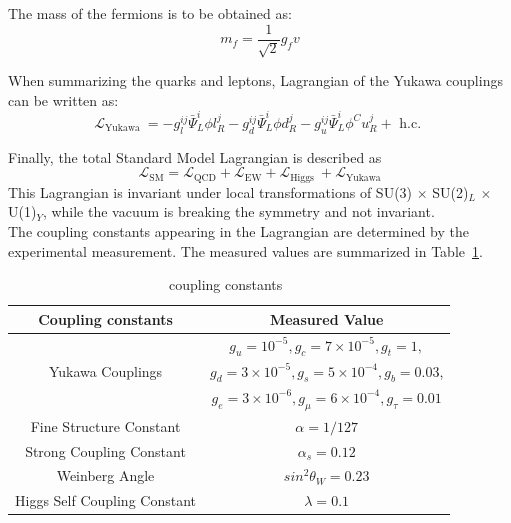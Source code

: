 The mass of the fermions is to be obtained as:
\begin{equation}
m_{f}=\frac{1}{\sqrt{2}} g_{f} v
\end{equation}

When summarizing the quarks and leptons, Lagrangian of the Yukawa couplings can be written as:
\begin{equation}
\mathcal{L}_{\text {Yukawa }}=-g_{l}^{i j} \bar{\Psi}_{L}^{i} \phi l_{R}^{j}-g_{d}^{i j} \bar{\Psi}_{L}^{i} \phi d_{R}^{j}-g_{u}^{i j} \bar{\Psi}_{L}^{i} \phi^{C} u_{R}^{j}+\text { h.c. }
\end{equation}

Finally, the total Standard Model Lagrangian is described as 
\begin{equation}
\mathcal{L}_{\mathrm{SM}}=\mathcal{L}_{\mathrm{QCD}}+\mathcal{L}_{\mathrm{EW}}+\mathcal{L}_{\text {Higgs }}+\mathcal{L}_{\text {Yukawa}}
\end{equation}
This Lagrangian is invariant under local transformations of SU(3) $\times$ SU(2)$_L$ $\times$ U(1)$_Y$, while the vacuum is breaking the symmetry and not invariant. \\

The coupling constants appearing in the Lagrangian are determined by the experimental measurement. 
The measured values are summarized in Table~\ref{tab:constants}.  \\

\begin{center}
\begin{table}
\centering
\begin{tabular}{|c|c|}
\hline
Coupling constants & Measured Value \\
\hline 
                             & $g_{u}=10^{-5}, g_{c}=7 \times 10^{-5}, g_{t}=1,$ \\
            Yukawa Couplings & $g_{d}=3 \times 10^{-5}, g_{s}=5 \times 10^{-4}, g_{b}=0.03$, \\
                             & $g_{e}=3 \times 10^{-6}, g_{\mu}=6 \times 10^{-4}, g_{\tau}=0.01$ \\
     Fine Structure Constant & $\alpha=1 / 127$ \\
    Strong Coupling Constant & $\alpha_{s}=0.12$ \\
              Weinberg Angle & $sin^{2} \theta_{W}=0.23$ \\
Higgs Self Coupling Constant & $\lambda=0.1$ \\
\hline
\end{tabular}
\caption{coupling constants~\cite{PhysRevD.98.030001}}
\label{tab:constants}
\end{table}
\end{center}

